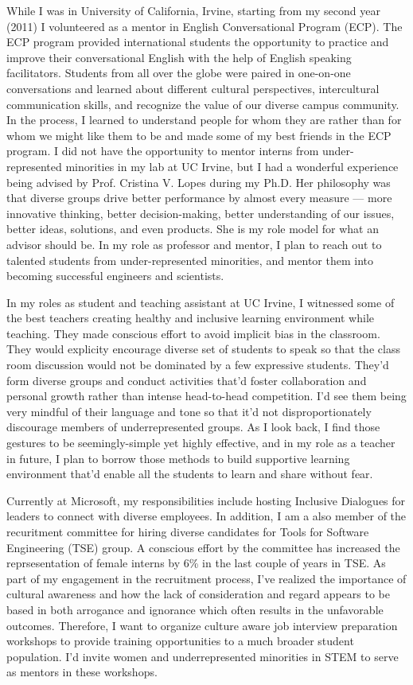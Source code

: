 \documentclass[a4paper, 12pt]{article}
\begin{document}
While I was in University of California, Irvine, starting from my second year (2011) I volunteered as a mentor in English Conversational Program (ECP). The ECP program provided international students the opportunity to practice and improve their conversational English with the help of English speaking facilitators. Students from all over the globe were paired in one-on-one conversations and learned about different cultural perspectives, intercultural communication skills, and recognize the value of our diverse campus community. In the process, I learned to understand people for whom they are rather than for whom we might like them to be and made some of my best friends in the ECP program. I did not have the opportunity to mentor interns from under-represented minorities in my lab at UC Irvine, but I had a wonderful experience being advised by Prof. Cristina V. Lopes during my Ph.D. Her philosophy was that diverse groups drive better performance by almost every measure --- more innovative thinking, better decision-making, better understanding of our issues, better ideas, solutions, and even products.  She is my role model for what an advisor should be. In my role as professor and mentor, I plan to reach out to talented students from under-represented minorities, and mentor them into becoming successful engineers and scientists.  

In my roles as student and teaching assistant at UC Irvine, I witnessed some of the best teachers creating healthy and inclusive learning environment while teaching. They made conscious effort to avoid implicit bias in the classroom. They would explicity encourage diverse set of students to speak so that the class room discussion would not be dominated by a few expressive students. They'd form diverse groups and conduct activities that'd foster collaboration and personal growth rather than intense head-to-head competition. I'd see them being very mindful of their language and tone so that it'd not disproportionately discourage members of underrepresented groups. As I look back, I find those gestures to be seemingly-simple yet highly effective, and in my role as a teacher in future, I plan to borrow those methods to build supportive learning environment that'd enable all the students to learn and share without fear.

Currently at Microsoft, my responsibilities include hosting Inclusive Dialogues for leaders to connect with diverse employees. In addition, I am a also member of the recuritment committee for hiring diverse candidates for Tools for Software Engineering (TSE) group. A conscious effort by the committee has increased the reprsesentation of female interns by 6\% in the last couple of years in TSE. As part of my engagement in the recruitment process, I've realized the importance of cultural awareness and how the lack of consideration and regard appears to be based in both arrogance and ignorance which often results in the unfavorable outcomes. Therefore, I want to organize culture aware job interview preparation workshops to provide training opportunities to a much broader student population. I'd invite women and underrepresented minorities in STEM to serve as mentors in these workshops.
\end{document}
